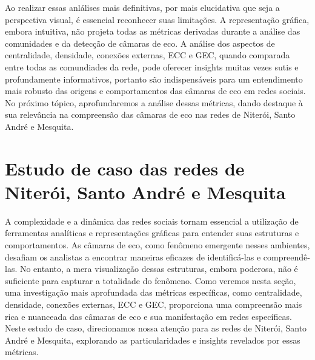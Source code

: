 Ao realizar essas anlálises mais definitivas, por mais elucidativa que seja a perspectiva visual, é essencial reconhecer suas limitações. A representação gráfica, embora intuitiva, não projeta todas as métricas derivadas durante a análise das comunidades e da detecção de câmaras de eco. A análise dos aspectos de centralidade, densidade, conexões externas, ECC e GEC, quando comparada entre todas as comundiades da rede, pode oferecer insights muitas vezes sutis e profundamente informativos, portanto são indispensáveis para um entendimento mais robusto das origens e comportamentos das câmaras de eco em redes sociais. No próximo tópico, aprofundaremos a análise dessas métricas, dando destaque à sua relevância na compreensão das câmaras de eco nas redes de Niterói, Santo André e Mesquita.

\section{Estudo de caso das redes de Niterói, Santo André e Mesquita}

A complexidade e a dinâmica das redes sociais tornam essencial a utilização de ferramentas analíticas e representações gráficas para entender suas estruturas e comportamentos. As câmaras de eco, como fenômeno emergente nesses ambientes, desafiam os analistas a encontrar maneiras eficazes de identificá-las e compreendê-las. No entanto, a mera visualização dessas estruturas, embora poderosa, não é suficiente para capturar a totalidade do fenômeno. Como veremos nesta seção, uma investigação mais aprofundada das métricas específicas, como centralidade, densidade, conexões externas, ECC e GEC, proporciona uma compreensão mais rica e nuanceada das câmaras de eco e sua manifestação em redes específicas. Neste estudo de caso, direcionamos nossa atenção para as redes de Niterói, Santo André e Mesquita, explorando as particularidades e insights revelados por essas métricas.

